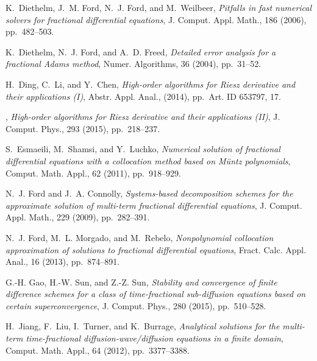 \documentclass[10pt]{siamltex}
\begin{document}
\begin{thebibliography}{10}
{\sc K.~Diethelm, J.~M. Ford, N.~J. Ford, and M.~Weilbeer}, {\em Pitfalls in
  fast numerical solvers for fractional differential equations}, J. Comput.
  Appl. Math., 186 (2006), pp.~482--503.

{\sc K.~Diethelm, N.~J. Ford, and A.~D. Freed}, {\em Detailed error analysis
  for a fractional {A}dams method}, Numer. Algorithms, 36 (2004), pp.~31--52.


{\sc H.~Ding, C.~Li, and Y.~Chen}, {\em High-order algorithms for {R}iesz
  derivative and their applications {(I)}}, Abstr. Appl. Anal.,  (2014),
  pp.~Art. ID 653797, 17.

\leavevmode\vrule height 2pt depth -1.6pt width 23pt, {\em High-order
  algorithms for {R}iesz derivative and their applications ({II})}, J. Comput.
  Phys., 293 (2015), pp.~218--237.

{\sc S.~Esmaeili, M.~Shamsi, and Y.~Luchko}, {\em Numerical solution of
  fractional differential equations with a collocation method based on
  {M}\"untz polynomials}, Comput. Math. Appl., 62 (2011), pp.~918--929.

{\sc N.~J. Ford and J.~A. Connolly}, {\em Systems-based decomposition schemes
  for the approximate solution of multi-term fractional differential
  equations}, J. Comput. Appl. Math., 229 (2009), pp.~282--391.

{\sc N.~J. Ford, M.~L. Morgado, and M.~Rebelo}, {\em Nonpolynomial collocation
  approximation of solutions to fractional differential equations}, Fract.
  Calc. Appl. Anal., 16 (2013), pp.~874--891.

{\sc G.-H. Gao, H.-W. Sun, and Z.-Z. Sun}, {\em Stability and convergence of
  finite difference schemes for a class of time-fractional sub-diffusion
  equations based on certain superconvergence}, J. Comput. Phys., 280 (2015),
  pp.~510--528.



{\sc H.~Jiang, F.~Liu, I.~Turner, and K.~Burrage}, {\em Analytical solutions
  for the multi-term time-fractional diffusion-wave/diffusion equations in a
  finite domain}, Comput. Math. Appl., 64 (2012), pp.~3377--3388.


\end{thebibliography}
\end{document}
